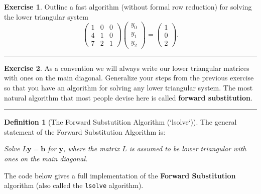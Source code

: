 \documentclass[
]{book}
\theoremstyle{definition}
\newtheorem{definition}{Definition}[chapter]
\theoremstyle{definition}
\theoremstyle{definition}
\newtheorem{exercise}{Exercise}[chapter]
\theoremstyle{remark}
\begin{document}
\begin{exercise}
\protect\hypertarget{exr:unnamed-chunk-323}{}{\label{exr:unnamed-chunk-323} }Outline a fast algorithm (without formal row reduction) for solving the lower triangular system
\[\begin{pmatrix} 1 & 0 & 0 \\ 4 & 1 & 0 \\ 7 & 2 & 1 \end{pmatrix} \begin{pmatrix}
        y_0 \\ y_1 \\ y_2 \end{pmatrix} = \begin{pmatrix} 1 \\ 0 \\ 2\end{pmatrix}.\]
\end{exercise}

\begin{center}\rule{0.5\linewidth}{0.5pt}\end{center}

\begin{exercise}
\protect\hypertarget{exr:unnamed-chunk-324}{}{\label{exr:unnamed-chunk-324} }As a convention we will always write our lower triangular matrices with ones on the main diagonal. Generalize your steps from the previous exercise so that you have an algorithm for solving any lower triangular system. The most natural algorithm that most people devise here is called \textbf{forward substitution}.
\end{exercise}

\begin{center}\rule{0.5\linewidth}{0.5pt}\end{center}

\begin{definition}[The Forward Substutition Algorithm (`lsolve`)]
\protect\hypertarget{def:lsolve}{}{\label{def:lsolve} {} }The general statement of the Forward Substitution Algorithm is:

\emph{Solve \(L \boldsymbol{y} = \boldsymbol{b}\) for \(\boldsymbol{y}\), where the matrix \(L\) is assumed to be lower triangular with ones on the main diagonal.}

The code below gives a full implementation of the \textbf{Forward Substitution} algorithm (also called the \texttt{lsolve} algorithm).
\end{definition}
\end{document}
